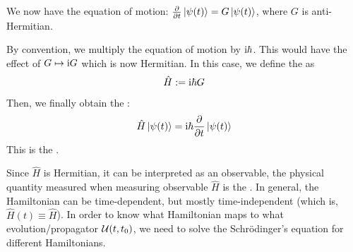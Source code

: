 We now have the equation of motion: $\pdv{t} \ket{\psi(t)} = G\ket{\psi(t)}$, where $G$ is anti-Hermitian. \par
By convention, we multiply the equation of motion by $\mathrm{i} \hbar$. This would have the effect of $G \mapsto \mathrm{i} G$ which is now Hermitian. In this case, we define the  as 
$$\hat{H} := \mathrm{i} \hbar G$$
Then, we finally obtain the :
$$\hat{H}\ket{\psi(t)} = \mathrm{i} \hbar \pdv{t} \ket{\psi(t)}$$
This is the . \par
Since $\hat{H}$ is Hermitian, it can be interpreted as an observable, the physical quantity measured when measuring observable $\hat{H}$ is the . In general, the Hamiltonian can be time-dependent, but mostly time-independent (which is, $\hat{H}(t) \equiv \hat{H}$). In order to know what Hamiltonian maps to what evolution/propagator $\mathcal{U}(t, t_0)$, we need to solve the Schr\"odinger's equation for different Hamiltonians.

